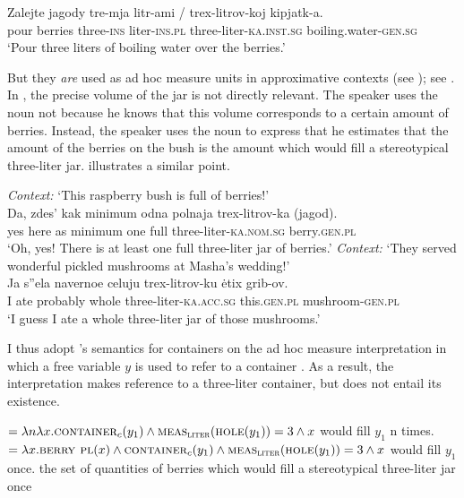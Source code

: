 \documentclass[output=paper]{langscibook}
\begin{document}
\ea\label{ex:khrizmann:31} \gll Zalejte jagody tre-mja litr-ami /  trex-litrov-koj kipjatk-a.\\
pour berries three-\textsc{ins} liter-\textsc{ins.pl} {} {} three-liter-\textsc{ka.inst.sg} boiling.water-\textsc{gen.sg}\\
\glt `Pour three liters of boiling water over the berries.'
\z

\noindent But they \textit{are} used as ad hoc measure units in approximative contexts (see \citealt{Partee.Borschev2012, Rothstein2017}); see . In , the precise volume of the jar is not directly relevant. The speaker uses the noun not because he knows that this volume corresponds to a certain amount of berries. Instead, the speaker uses the noun to express that he estimates that the amount of the berries on the bush is the amount which would fill a stereotypical three-liter jar.  illustrates a similar point.


\ea\label{ex:khrizmann:32} \textit{Context:} `This raspberry bush is full of berries!'\\
\gll Da, zdes' kak minimum odna polnaja trex-litrov-ka (jagod).\\
yes here as minimum one full three-liter-\textsc{ka.nom.sg} \phantom{(}berry.\textsc{gen.pl}\\
\glt `Oh, yes! There is at least one full three-liter jar of berries.'
\ex\label{ex:khrizmann:33} \textit{Context:} `They served wonderful pickled mushrooms at Masha's wedding!'\\
\gll Ja s''ela navernoe celuju trex-litrov-ku ėtix grib-ov.\\
I ate probably whole three-liter-\textsc{ka.acc.sg} this.\textsc{gen.pl} mushroom-\textsc{gen.pl}\\
\glt `I guess I ate a whole three-liter jar of those mushrooms.'
\z

\noindent I thus adopt \citeauthor{Partee.Borschev2012}'s semantics for containers on the ad hoc measure interpretation in which a free variable $y$ is used to refer to a container . As a result, the interpretation makes reference to a three-liter container, but does not entail its existence.

\ea\label{ex:khrizmann:34}
    \ea {} $= \lambda n \lambda x.\textsc{container}_{c}(y_1) \wedge \textsc{meas}_{\textsc{liter}}(\textsc{hole}(y_1)) = 3 \wedge x$ would fill $y_1$ n times.
    \ex {} $= \lambda x.\textsc{berry pl}(x) \wedge \textsc{container}_{c}(y_1) \wedge \textsc{meas}_{\textsc{liter}}(\textsc{hole}(y_1)) = 3 \wedge x$ would fill $y_1$ once.
    \z
{the set of quantities of berries which would fill a stereotypical three-liter jar once}
\z\largerpage
\end{document}
